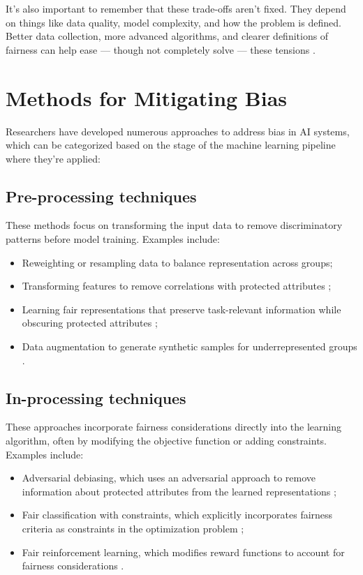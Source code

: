\documentclass[12pt,a4paper,openright,twoside]{book}
\begin{document}
It’s also important to remember that these trade-offs aren’t fixed. They depend on things like data quality, model complexity, and how the problem is defined. Better data collection, more advanced algorithms, and clearer definitions of fairness can help ease — though not completely solve — these tensions \cite{kusner2017counterfactual, chouldechova2020snapshot}.

\section{Methods for Mitigating Bias}
Researchers have developed numerous approaches to address bias in AI systems, which can be categorized based on the stage of the machine learning pipeline where they're applied:


\subsection{Pre-processing techniques}
These methods focus on transforming the input data to remove discriminatory patterns before model training. Examples include:
\begin{itemize}
    \item Reweighting or resampling data to balance representation across groups;
    \item Transforming features to remove correlations with protected attributes \cite{kamiran2013quantifying};
    \item Learning fair representations that preserve task-relevant information 
    while obscuring protected attributes \cite{mehrabi2021survey};
    \item Data augmentation to generate synthetic samples for underrepresented groups \cite{mehrabi2021survey}.
\end{itemize}
    

\subsection{In-processing techniques} 
These approaches incorporate fairness considerations directly into the learning algorithm, often by modifying the objective function or adding constraints. Examples include:
\begin{itemize}
    \item Adversarial debiasing, which uses an adversarial approach to remove information about protected attributes from the learned representations \cite{mehrabi2021survey};
    \item Fair classification with constraints, which explicitly incorporates fairness criteria as constraints in the optimization problem \cite{corbett2023measure};
    \item Fair reinforcement learning, which modifies reward functions to account for fairness considerations \cite{mehrabi2021survey}.
\end{itemize}
    
\end{document}

